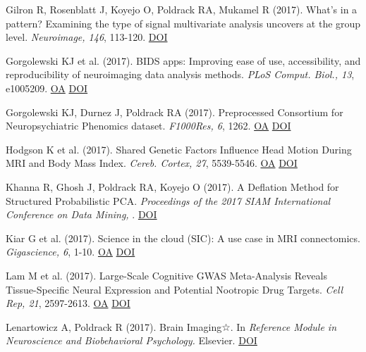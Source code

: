 Gilron R, Rosenblatt J, Koyejo O, Poldrack RA, Mukamel R (2017). What's in a pattern? Examining the type of signal multivariate analysis uncovers at the group level. \textit{Neuroimage, 146}, 113-120. \href{http://dx.doi.org/10.1016/j.neuroimage.2016.11.019}{DOI} \vspace{2mm}

Gorgolewski KJ et al. (2017). BIDS apps: Improving ease of use, accessibility, and reproducibility of neuroimaging data analysis methods. \textit{PLoS Comput. Biol., 13}, e1005209. \href{https://www.ncbi.nlm.nih.gov/pmc/articles/PMC5363996}{OA} \href{http://dx.doi.org/10.1371/journal.pcbi.1005209}{DOI} \vspace{2mm}

Gorgolewski KJ, Durnez J, Poldrack RA (2017). Preprocessed Consortium for Neuropsychiatric Phenomics dataset. \textit{F1000Res, 6}, 1262. \href{https://www.ncbi.nlm.nih.gov/pmc/articles/PMC5664981}{OA} \href{http://dx.doi.org/10.12688/f1000research.11964.2}{DOI} \vspace{2mm}

Hodgson K et al. (2017). Shared Genetic Factors Influence Head Motion During MRI and Body Mass Index. \textit{Cereb. Cortex, 27}, 5539-5546. \href{https://www.ncbi.nlm.nih.gov/pmc/articles/PMC6075600}{OA} \href{http://dx.doi.org/10.1093/cercor/bhw321}{DOI} \vspace{2mm}

Khanna R, Ghosh J, Poldrack RA,  Koyejo O (2017). A Deflation Method for Structured Probabilistic PCA. \textit{Proceedings of the 2017 SIAM International Conference on Data Mining, }. \href{http://dx.doi.org/10.1137/1.9781611974973.60}{DOI} \vspace{2mm}

Kiar G et al. (2017). Science in the cloud (SIC): A use case in MRI connectomics. \textit{Gigascience, 6}, 1-10. \href{https://www.ncbi.nlm.nih.gov/pmc/articles/PMC5467033}{OA} \href{http://dx.doi.org/10.1093/gigascience/gix013}{DOI} \vspace{2mm}

Lam M et al. (2017). Large-Scale Cognitive GWAS Meta-Analysis Reveals Tissue-Specific Neural Expression and Potential Nootropic Drug Targets. \textit{Cell Rep, 21}, 2597-2613. \href{https://www.ncbi.nlm.nih.gov/pmc/articles/PMC5789458}{OA} \href{http://dx.doi.org/10.1016/j.celrep.2017.11.028}{DOI} \vspace{2mm}

Lenartowicz A, Poldrack R (2017). Brain Imaging☆. In \textit{Reference Module in Neuroscience and Biobehavioral Psychology.} Elsevier. \href{http://dx.doi.org/10.1016/b978-0-12-809324-5.00274-1}{DOI} \vspace{2mm}

